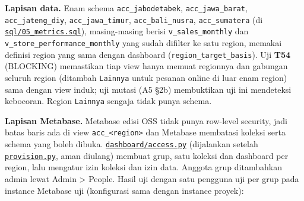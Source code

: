 \documentclass[10pt,a4paper]{article}
\begin{document}
\textbf{Lapisan data.} Enam schema \texttt{acc\_\allowbreak{}jabodetabek}, \texttt{acc\_\allowbreak{}jawa\_\allowbreak{}barat}, \texttt{acc\_\allowbreak{}jateng\_\allowbreak{}diy}, \texttt{acc\_\allowbreak{}jawa\_\allowbreak{}timur}, \texttt{acc\_\allowbreak{}bali\_\allowbreak{}nusra}, \texttt{acc\_\allowbreak{}sumatera} (di \href{https://github.com/titan2903/kirana-omnichannel-performance-intelligence/blob/master/sql/05_metrics.sql}{\texttt{sql/05\_\allowbreak{}metrics.sql}}), masing-masing berisi \texttt{v\_\allowbreak{}sales\_\allowbreak{}monthly} dan \texttt{v\_\allowbreak{}store\_\allowbreak{}performance\_\allowbreak{}monthly} yang sudah difilter ke satu region, memakai definisi region yang sama dengan dashboard (\texttt{region\_\allowbreak{}target\_\allowbreak{}basis}). Uji \textbf{T54} (BLOCKING) memastikan tiap view hanya memuat regionnya dan gabungan seluruh region (ditambah \texttt{Lainnya} untuk pesanan online di luar enam region) sama dengan view induk; uji mutasi (A5 §2b) membuktikan uji ini mendeteksi kebocoran. Region \texttt{Lainnya} sengaja tidak punya schema.

\textbf{Lapisan Metabase.} Metabase edisi OSS tidak punya row-level security, jadi batas baris ada di view \texttt{acc\_\allowbreak{}\textless{}region\textgreater{}} dan Metabase membatasi koleksi serta schema yang boleh dibuka. \href{https://github.com/titan2903/kirana-omnichannel-performance-intelligence/blob/master/dashboard/access.py}{\texttt{dashboard/access.py}} (dijalankan setelah \href{https://github.com/titan2903/kirana-omnichannel-performance-intelligence/blob/master/dashboard/provision.py}{\texttt{provision.py}}, aman diulang) membuat grup, satu koleksi dan dashboard per region, lalu mengatur izin koleksi dan izin data. Anggota grup ditambahkan admin lewat Admin \textgreater{} People. Hasil uji dengan satu pengguna uji per grup pada instance Metabase uji (konfigurasi sama dengan instance proyek):
\end{document}
